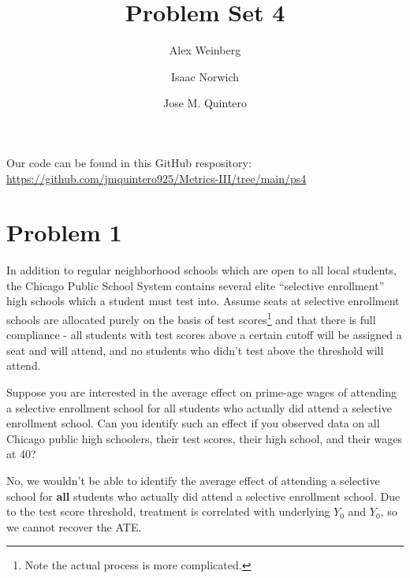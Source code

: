 \documentclass{article}
\title{Problem Set 4}
\author{Alex Weinberg \and Isaac Norwich \and Jose M. Quintero}
\begin{document}
\maketitle

Our code can be found in this GitHub respository: \url{https://github.com/jmquintero925/Metrics-III/tree/main/ps4}


\section*{Problem 1}
In addition to regular neighborhood schools which are open to all local students, the Chicago Public School System contains several elite ``selective enrollment'' high schools which a student must test into. Assume seats at selective enrollment schools are allocated purely on the basis of test scores\footnote{Note the actual process is more complicated.} and that there is full compliance - all students with test scores above a certain cutoff will be assigned a seat and will attend, and no students who didn't test above the threshold will attend.

\begin{problem}{1}
Suppose you are interested in the average effect on prime-age wages of attending a selective enrollment school for all students who actually did attend a selective enrollment school. Can you identify such an effect if you observed data on all Chicago public high schoolers, their test scores, their high school, and their wages at 40?
\end{problem}
\begin{solution}
No, we wouldn't be able to identify the average effect of attending a selective school for \textbf{all} students who actually did attend a selective enrollment school. Due to the test score threshold, treatment is correlated with underlying $Y_0$ and $Y_0$, so we cannot recover the ATE.
\end{solution}
\end{document}
